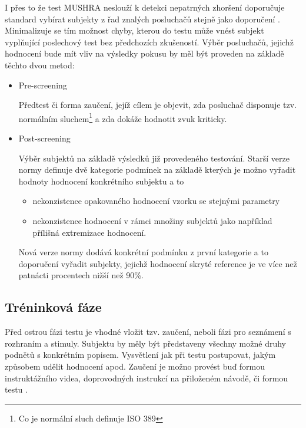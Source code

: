 I přes to že test MUSHRA neslouží k detekci nepatrných zhoršení doporučuje standard vybírat subjekty z řad znalých posluchačů stejně jako doporučení \cite{itur:1116}. Minimalizuje se tím možnost chyby, kterou do testu může vnést subjekt vyplňující poslechový test bez předchozích zkušeností. Výběr posluchačů, jejichž hodnocení bude mít vliv na výsledky pokusu by měl být proveden na základě těchto dvou metod:

\begin{itemize}
    \item Pre-screening
    
    Předtest či forma zaučení, jejíž cílem je objevit, zda posluchač disponuje tzv. normálním sluchem\footnote{Co je normální sluch definuje ISO 389} a zda dokáže hodnotit zvuk kriticky.
    
    \item Post-screening
    
    Výběr subjektů na základě výsledků již provedeného testování. Starší verze normy \cite{itur:1534} definuje dvě kategorie podmínek na základě kterých je možno vyřadit hodnoty hodnocení konkrétního subjektu a to
    
    \begin{itemize}
        \item  nekonzistence opakovaného hodnocení vzorku se stejnými parametry
        \item nekonzistence hodnocení v rámci množiny subjektů jako například přílišná extremizace hodnocení.
    \end{itemize}
    
    Nová verze normy \cite{itur:1534-3} dodává konkrétní podmínku z první kategorie a to doporučení vyřadit subjekty, jejichž hodnocení skryté reference je ve více než patnácti procentech nižší než 90\%.
    
\end{itemize}

\subsection{Tréninková fáze}

Před ostrou fázi testu je vhodné vložit tzv. zaučení, neboli fázi pro seznámení s rozhraním a stimuly. Subjektu by měly být představeny všechny možné druhy podnětů s konkrétním popisem. Vysvětlení jak při testu postupovat, jakým způsobem udělit hodnocení apod. Zaučení je možno provést buď formou instruktážního videa, doprovodných instrukcí na přiloženém návodě, či formou testu .

